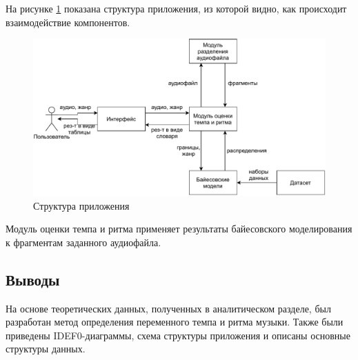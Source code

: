 На рисунке \ref{img:sw_structure} показана структура приложения, из которой видно, как происходит взаимодействие компонентов.

\begin{figure}[h]
	\centering
	\includegraphics[scale=0.9]{svg/sw_structure.pdf}
	\caption{Структура приложения}
	\label{img:sw_structure}
\end{figure}

Модуль оценки темпа и ритма применяет результаты байесовского моделирования к фрагментам заданного аудиофайла.

\newpage

\subsection*{Выводы}

На основе теоретических данных, полученных в аналитическом разделе, был разработан метод определения переменного темпа и ритма музыки. Также были приведены IDEF0-диаграммы, схема структуры приложения и описаны основные структуры данных.

